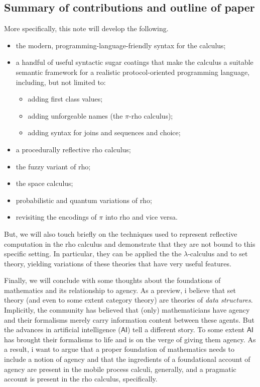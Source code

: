 \subsection{Summary of contributions and outline of paper}
More specifically, this note will develop the following.
\begin{itemize}
  \item the modern, programming-language-friendly syntax for the calculus;
  \item a handful of useful syntactic sugar coatings that make the
    calculus a suitable semantic framework for a realistic
    protocol-oriented programming language, including, but not limited
    to:
    \begin{itemize}
      \item adding first class values;
      \item adding unforgeable names (the $\pi$-rho calculus);
      \item adding syntax for joins and sequences and choice;
    \end{itemize}
  \item a procedurally reflective rho calculus;
  \item the fuzzy variant of rho;
  \item the space calculus;
  \item probabilistic and quantum variations of rho;
  \item revisiting the encodings of $\pi$ into rho and vice versa.
\end{itemize}

But, we will also touch briefly on the techniques used to represent
reflective computation in the rho calculus and demonstrate that they
are not bound to this specific setting. In particular, they can be
applied the the $\lambda$-calculus and to set theory, yielding
variations of these theories that have very useful features.

Finally, we will conclude with some thoughts about the foundations of
mathematics and its relationship to agency. As a preview, i believe
that set theory (and even to some extent category theory) are theories
of \emph{data structures}. Implicitly, the community has believed that
(only) mathematicians have agency and their formalisms merely carry
information content between these agents. But the advances in
artificial intelligence ($\mathsf{AI}$) tell a different story. To
some extent $\mathsf{AI}$ has brought their formalisms to life and is
on the verge of giving them agency. As a result, i want to argue that
a proper foundation of mathematics needs to include a notion of agency
and that the ingredients of a foundational account of agency are
present in the mobile process calculi, generally, and a pragmatic
account is present in the rho calculus, specifically.

